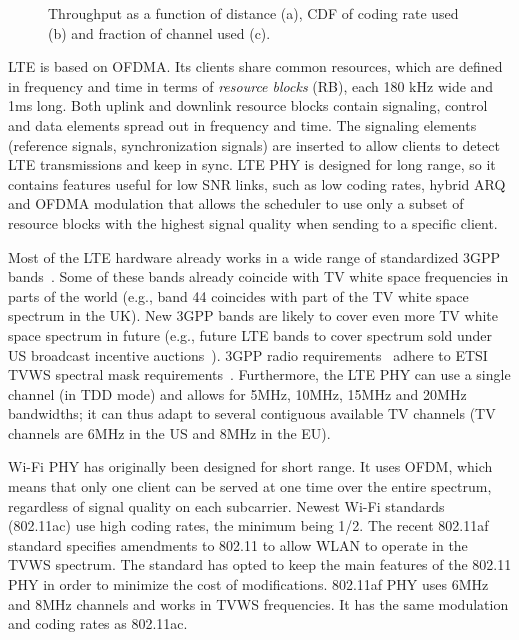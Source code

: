 \begin{figure}[t]
\begin{minipage}{0.32\textwidth}
  \end{minipage}
      \vspace{-0.15in}
 \caption{Throughput as a function of distance (a), CDF of coding rate used (b) and fraction of channel used (c).}
  \label{fig:phy}
\vskip -10pt
\end{figure}


LTE is based on OFDMA. Its clients share common resources, which are defined in frequency and time in terms of \emph{resource blocks} (RB), each 180 kHz wide and 1ms long. 
Both uplink and downlink resource blocks contain signaling, control and data elements spread out in frequency and time. 
The signaling elements (reference signals, synchronization signals) are inserted to allow clients to detect LTE transmissions and keep in sync. 
LTE PHY is designed for long range, so it contains features useful for low SNR links, such as low coding rates, hybrid ARQ and OFDMA modulation that allows 
the scheduler to use only a subset of resource blocks with the highest signal quality when sending to a specific client.

Most of the LTE hardware already works in a wide range of standardized 3GPP bands~\cite{36_101}. Some of these bands already coincide with TV white space frequencies in parts of the world (e.g., band 44 coincides with part of the TV white space spectrum in the UK). New 3GPP bands are likely to cover even more TV white space spectrum in future (e.g., future LTE bands to cover spectrum sold under US broadcast incentive auctions~\cite{fcc_600}). 
3GPP radio requirements~\cite{36_101, 36_104} adhere to ETSI TVWS spectral mask requirements~\cite{etsi_tvws}. 
Furthermore, the LTE PHY can use a single channel (in TDD mode) and allows for 5MHz, 10MHz, 15MHz and 20MHz bandwidths; it can thus adapt to several contiguous available TV channels (TV channels are 6MHz in the US and 8MHz in the EU). 

Wi-Fi PHY has originally been designed for short range. It uses OFDM, which means that only one client can be served at one time over the entire spectrum, regardless of signal quality on each subcarrier. Newest Wi-Fi standards (802.11ac) use high coding rates, the minimum being 1/2. 
The recent 802.11af~\cite{Rice_af} standard specifies amendments to 802.11 to allow WLAN to operate in the TVWS spectrum. The standard has opted to keep the main features of the 802.11 PHY in order to minimize the cost of modifications. 802.11af PHY uses 6MHz and 8MHz channels and works in TVWS frequencies. It has the same modulation and coding rates as 802.11ac. 

